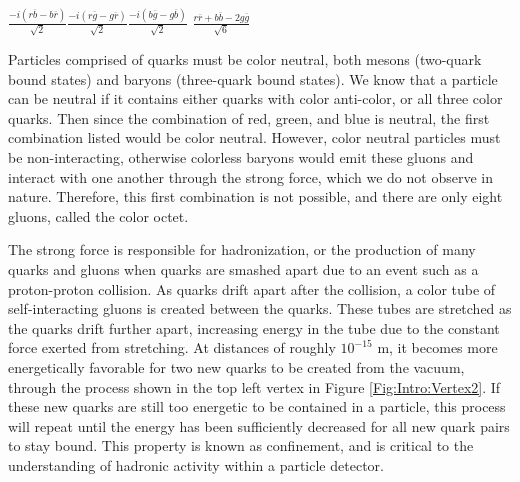 {\centering  

    $\frac{-i(r\overline{b} - b\overline{r})}{\sqrt{2}}$\hspace{1cm}$\frac{-i(r\overline{g} - g\overline{r})}{\sqrt{2}}$\hspace{1cm}$\frac{-i(b\overline{g} - g\overline{b})}{\sqrt{2}}$ \hspace{1cm}$\frac{r\overline{r} + b\overline{b} -2g\overline{g}}{\sqrt{6}}$
    
    }

Particles comprised of quarks must be color neutral, both mesons (two-quark bound states) and baryons (three-quark bound states). We know that a particle can be neutral if it contains either quarks with color anti-color, or all three color quarks. Then since the combination of red, green, and blue is neutral, the first combination listed would be color neutral. However, color neutral particles must be non-interacting, otherwise colorless baryons would emit these gluons and interact with one another through the strong force, which we do not observe in nature. Therefore, this first combination is not possible, and there are only eight gluons, called the color octet.

The strong force is responsible for hadronization, or the production of many quarks and gluons when quarks are smashed apart due to an event such as a proton-proton collision. As quarks drift apart after the collision, a color tube of self-interacting gluons is created between the quarks. These tubes are stretched as the quarks drift further apart, increasing energy in the tube due to the constant force exerted from stretching. At distances of roughly $10^{-15}$ m, it becomes more energetically favorable for two new quarks to be created from the vacuum, through the process shown in the top left vertex in Figure \ref{Fig:Intro:Vertex2}. If these new quarks are still too energetic to be contained in a particle, this process will repeat until the energy has been sufficiently decreased for all new quark pairs to stay bound. This property is known as confinement, and is critical to the understanding of hadronic activity within a particle detector.

